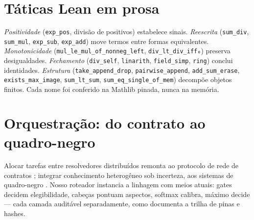 \section{Táticas Lean em prosa}
\textit{Positividade} (\texttt{exp\_pos}, divisão de positivos) estabelece sinais. \textit{Reescrita} (\texttt{sum\_div}, \texttt{sum\_mul}, \texttt{exp\_sub}, \texttt{exp\_add}) move termos entre formas equivalentes. \textit{Monotonicidade} (\texttt{mul\_le\_mul\_of\_nonneg\_left}, \texttt{div\_lt\_div\_iff₀}) preserva desigualdades. \textit{Fechamento} (\texttt{div\_self}, \texttt{linarith}, \texttt{field\_simp}, \texttt{ring}) conclui identidades. \textit{Estrutura} (\texttt{take\_append\_drop}, \texttt{pairwise\_append}, \texttt{add\_sum\_erase}, \texttt{exists\_max\_image}, \texttt{sum\_lt\_sum}, \texttt{sum\_eq\_single\_of\_mem}) decompõe objetos finitos. Cada nome foi conferido na Mathlib pinada, nunca na memória.
\section{Orquestração: do contrato ao quadro-negro}
Alocar tarefas entre resolvedores distribuídos remonta ao protocolo de rede de contratos \cite{smith1980}; integrar conhecimento heterogêneo sob incerteza, aos sistemas de quadro-negro \cite{erman1980}. Nosso roteador instancia a linhagem com meios atuais: gates decidem elegibilidade, cabeças pontuam aspectos, softmax calibra, máximo decide --- cada camada auditável separadamente, como documenta a trilha de pinas e hashes.
